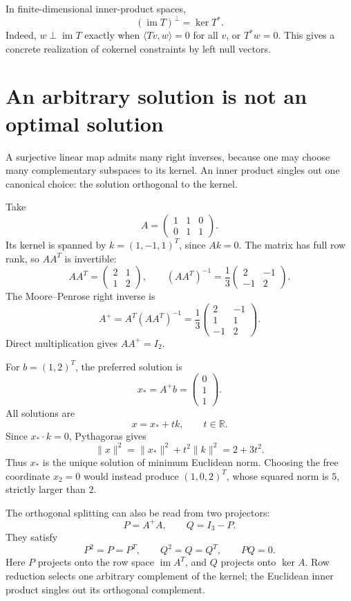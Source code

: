 In finite-dimensional inner-product spaces,
\[
 \boxed{(\operatorname{im}T)^\perp=\ker T^*.}
\]
Indeed, \(w\perp\operatorname{im}T\) exactly when
\(\langle Tv,w\rangle=0\) for all \(v\), or \(T^*w=0\). This gives a concrete realization of cokernel constraints by left null vectors.

\section{An arbitrary solution is not an optimal solution}

A surjective linear map admits many right inverses, because one may choose many complementary subspaces to its kernel. An inner product singles out one canonical choice: the solution orthogonal to the kernel.

Take
\[
 A=\begin{pmatrix}1&1&0\\0&1&1\end{pmatrix}.
\]
Its kernel is spanned by \(k=(1,-1,1)^T\), since \(Ak=0\). The matrix has full row rank, so \(AA^T\) is invertible:
\[
 AA^T=\begin{pmatrix}2&1\\1&2\end{pmatrix},
 \qquad
 (AA^T)^{-1}=\frac13
 \begin{pmatrix}2&-1\\-1&2\end{pmatrix}.
\]
The Moore--Penrose right inverse is
\[
 \boxed{A^+=A^T(AA^T)^{-1}
 =\frac13\begin{pmatrix}
 2&-1\\1&1\\-1&2
 \end{pmatrix}.}
\]
Direct multiplication gives \(AA^+=I_2\).

For \(b=(1,2)^T\), the preferred solution is
\[
 x_*=A^+b=\begin{pmatrix}0\\1\\1\end{pmatrix}.
\]
All solutions are
\[
 x=x_*+tk,\qquad t\in\mathbb R.
\]
Since \(x_*\cdot k=0\), Pythagoras gives
\[
 \|x\|^2=\|x_*\|^2+t^2\|k\|^2=2+3t^2.
\]
Thus \(x_*\) is the unique solution of minimum Euclidean norm. Choosing the free coordinate \(x_2=0\) would instead produce \((1,0,2)^T\), whose squared norm is \(5\), strictly larger than \(2\).

The orthogonal splitting can also be read from two projectors:
\[
 P=A^+A,\qquad Q=I_3-P.
\]
They satisfy
\[
 P^2=P=P^T,\qquad Q^2=Q=Q^T,\qquad PQ=0.
\]
Here \(P\) projects onto the row space \(\operatorname{im}A^T\), and \(Q\) projects onto \(\ker A\). Row reduction selects one arbitrary complement of the kernel; the Euclidean inner product singles out its orthogonal complement.

